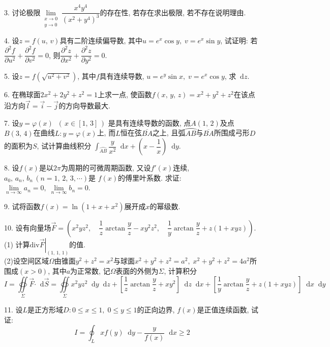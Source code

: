 \documentclass{article}
\newcommand*{\dif}{\mathop{}\!\mathrm{d}}
\begin{document}
3. 讨论极限$\lim\limits_{\substack{x \to 0 \\ y \to 0}}\dfrac{x^4y^4}{(x^2+y^4)^3}$的存在性, 若存在求出极限, 若不存在说明理由.\par

4. 设$z=f(u,\,v)$具有二阶连续偏导数, 其中$u=e^x\cos y, \; v=e^x \sin y$, 试证明: 若$\dfrac{\partial^2f}{\partial u^2}
+\dfrac{\partial^2f}{\partial v^2} = 0$, 则$\dfrac{\partial^2z}{\partial x^2}+\dfrac{\partial^2z}{\partial y^2}=0$.\par

5. 设$z=f(\sqrt{u^2+v^2})$, 其中$f$具有连续导数, $u=e^y\sin x, \; v=e^x\cos y$, 求$\dif z$.\par

6. 在椭球面$2x^2+2y^2+z^2=1$上求一点, 使函数$f(x,\,y,\,z)=x^2+y^2+z^2$在该点沿方向$\vec{l}=\vec{i}-\vec{j}$的方向导数最大.\par

7. 设$y=\varphi(x) \;\; (\,x \in [1,\,3]\,)$ 是具有连续导数的函数, 点$A(1,\,2)$及点$B(3,\,4)$在曲线$L: y=\varphi(x)$上, 而$L$恒在弦$\overline{BA}$之上, 且弧$\wideparen{AB}$与$\overline{BA}$所围成弓形$D$的面积为$S$, 试计算曲线积分
$\displaystyle\int_{\wideparen{AB}}{\dfrac{y}{x^2}\dif x + (x- \dfrac{1}{x})\dif y}$.\par

8. 设$f(x)$是以$2\pi$为周期的可微周期函数, 又设$f'(x)$连续, $a_0, \, a_n, \, b_n \, (n= 1, \, 2, \, 3, \cdots)$是
$f(x)$的傅里叶系数. 求证: $\lim\limits_{n \to \infty}{a_n=0}, \; \lim\limits_{n \to \infty}{b_n = 0}$.\par

9. 试将函数$f(x)=\ln(1+x+x^2)$展开成$x$的幂级数.\par

10. 设有向量场$\vec{F} = \left(x^2yz^2, \quad \dfrac{1}{z}\arctan \dfrac{y}{z} - xy^2z^2, \quad \dfrac{1}{y}\arctan \dfrac{y}{z} + z(1+xyz)\right)$.\\
(1) 计算$\left.\mathrm{div} \vec{F} \right|_{(1,\,1,\,1)}$的值.\\
(2)设空间区域$\Omega$由锥面$y^2+z^2=x^2$与球面$x^2+y^2+z^2=a^2, \; x^2+y^2+z^2=4a^2$所围成$(x>0)$, 其中$a$为正常数, 
记$\Omega$表面的外侧为$\Sigma$, 计算积分
$$I=\oiint\limits_\Sigma{\vec{F} \bm\cdot \dif \vec{S}} = \oiint\limits_\Sigma{x^2yz^2 \dif y \dif z +
\left[\frac{1}{z}\arctan\frac{y}{z} + xy^2\right] \dif z \dif x +
\left[\frac{1}{y}\arctan\frac{y}{z} + z(1+xyz)\right] \dif x \dif y}$$
\par

11. 设$L$是正方形域$D: 0\leqslant x \leqslant 1, \; 0\leqslant y \leqslant 1$的正向边界, $f(x)$是正值连续函数, 试证:
$$I=\oint_L{x f(y) \dif y - \dfrac{y}{f(x)} \dif x} \geqslant 2$$\par
\end{document}
